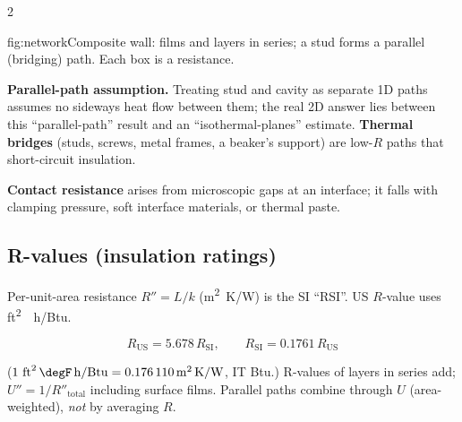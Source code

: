 \begin{multicols}{2}
\begin{reffig}{fig:network}{Composite wall: films and layers in series; a stud forms a parallel (bridging) path. Each box is a resistance.}
\end{reffig}

\textbf{Parallel-path assumption.} Treating stud and cavity as separate 1D paths assumes no sideways heat flow between them; the real 2D answer lies between this ``parallel-path'' result and an ``isothermal-planes'' estimate. \textbf{Thermal bridges} (studs, screws, metal frames, a beaker's support) are low-$R$ paths that short-circuit insulation.

\textbf{Contact resistance} arises from microscopic gaps at an interface; it falls with clamping pressure, soft interface materials, or thermal paste.

\subsection{R-values (insulation ratings)}\label{sec:rvalue}
\CORE{} Per-unit-area resistance $R''=L/k$ (\si{m^2.K/W}) is the SI ``RSI''. US $R$-value uses \si{ft^2.\degF.h/Btu}.
\begin{formulabox}
\begin{equation}
R_{\text{US}} = 5.678\,R_{\text{SI}},\qquad R_{\text{SI}}=0.1761\,R_{\text{US}} \label{F:transfer:rvalue}
\end{equation}
\end{formulabox}
($1\ \si{ft^2.\degF.h/Btu}=\SI{0.176110}{m^2.K/W}$, IT Btu.) R-values of layers in series add; $U''=1/R''_{\text{total}}$ including surface films. Parallel paths combine through $U$ (area-weighted), \emph{not} by averaging $R$.


\end{multicols}
